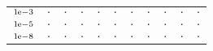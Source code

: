 \begin{tiny}
\begin{tabular}{@{$\;$}c@{$\;$}|@{$\;$}c@{$\;$}@{$\;$}c@{$\;$}@{$\;$}c@{$\;$}@{$\;$}c@{$\;$}@{$\;$}c@{$\;$}|@{$\;$}c@{$\;$}@{$\;$}c@{$\;$}@{$\;$}c@{$\;$}@{$\;$}c@{$\;$}@{$\;$}c@{$\;$}}
$\scriptstyle1\!\mathrm{\hspace{0.10em}e}-3$ & $\scriptstyle.$ & $\scriptstyle.$ & $\scriptstyle.$ & $\scriptstyle.$ & $\scriptstyle.$ & $\scriptstyle.$ & $\scriptstyle.$ & $\scriptstyle.$ & $\scriptstyle.$ & $\scriptstyle.$\\ 
$\scriptstyle1\!\mathrm{\hspace{0.10em}e}-5$ & $\scriptstyle.$ & $\scriptstyle.$ & $\scriptstyle.$ & $\scriptstyle.$ & $\scriptstyle.$ & $\scriptstyle.$ & $\scriptstyle.$ & $\scriptstyle.$ & $\scriptstyle.$ & $\scriptstyle.$\\ 
$\scriptstyle1\!\mathrm{\hspace{0.10em}e}-8$ & $\scriptstyle.$ & $\scriptstyle.$ & $\scriptstyle.$ & $\scriptstyle.$ & $\scriptstyle.$ & $\scriptstyle.$ & $\scriptstyle.$ & $\scriptstyle.$ & $\scriptstyle.$ & $\scriptstyle.$\\ 
\end{tabular} 
\end{tiny} 
